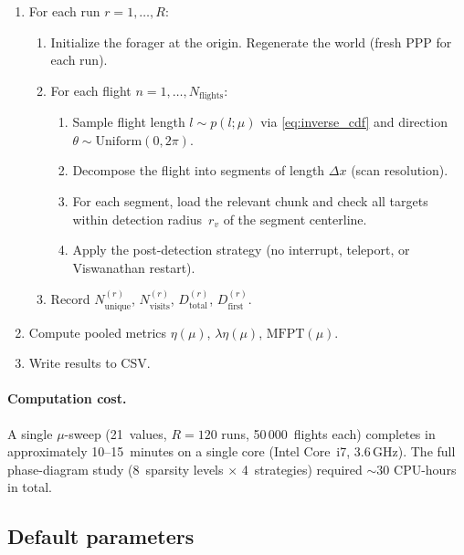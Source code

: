 \begin{enumerate}
  \item For each run $r = 1, \ldots, R$:
    \begin{enumerate}
      \item Initialize the forager at the origin.
            Regenerate the world (fresh PPP for each run).
      \item For each flight $n = 1, \ldots, N_{\mathrm{flights}}$:
        \begin{enumerate}
          \item Sample flight length $l \sim p(l;\mu)$ via
                \eqref{eq:inverse_cdf} and direction
                $\theta \sim \mathrm{Uniform}(0, 2\pi)$.
          \item Decompose the flight into segments of length
                $\Delta x$ (scan resolution).
          \item For each segment, load the relevant chunk and
                check all targets within detection radius~$r_v$
                of the segment centerline.
          \item Apply the post-detection strategy (no interrupt,
                teleport, or Viswanathan restart).
        \end{enumerate}
      \item Record $N_{\mathrm{unique}}^{(r)}$,
            $N_{\mathrm{visits}}^{(r)}$,
            $D_{\mathrm{total}}^{(r)}$,
            $D_{\mathrm{first}}^{(r)}$.
    \end{enumerate}
  \item Compute pooled metrics
        $\eta(\mu)$, $\lambda\eta(\mu)$, $\mathrm{MFPT}(\mu)$.
  \item Write results to CSV.
\end{enumerate}

\paragraph{Computation cost.}
A single $\mu$-sweep (21~values, $R = 120$ runs,
50\,000~flights each) completes in approximately
10--15~minutes on a single core (Intel Core~i7, 3.6\,GHz).
The full phase-diagram study (8~sparsity levels $\times$
4~strategies) required ${\sim}30$ CPU-hours in total.

\subsection{Default parameters}

